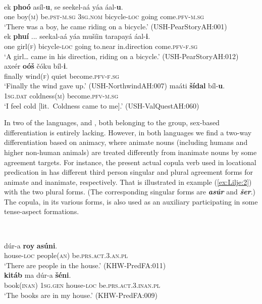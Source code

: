 \documentclass[output=collectionpaper]{langsci/langscibook}
\begin{document}
\ea
\label{ex:Lilje:1}
\\
\begin{xlist}
\ex
\gll ek \textbf{phoó} asíl-\textbf{u}, se seekel-aá yáa áal-\textbf{u}.\\
one boy(\textsc{m}) be.\textsc{pst-m.sg} \textsc{3sg.nom} bicycle-\textsc{loc} going come.\textsc{pfv-m.sg}\\
\glt  `There was a boy, he came riding on a bicycle.' (USH-PearStoryAH:001)\\
\ex
\gll ek \textbf{phuí} ... seekal-aá yáa mušíin tarapayá áal-\textbf{i}.\\
one girl(\textsc{f}) {} bicycle-\textsc{loc} going to.near in.direction come.\textsc{pfv-f.sg}\\
\glt `A girl… came in his direction, riding on a bicycle.' (USH-PearStoryAH:012)\\
\ex
\gll axeér \textbf{oóš} čóku bíl-\textbf{i}.    \\
finally wind(\textsc{f}) quiet become.\textsc{pfv-f.sg}    \\
\glt `Finally the wind gave up.' (USH-NorthwindAH:007)
\ex
\gll maáti \textbf{šídal} bíl-\textbf{u}.     \\
\textsc{1sg.dat} coldness(\textsc{m}) become.\textsc{pfv-m.sg}     \\
\glt `I feel cold [lit.\ Coldness came to me].' (USH-ValQuestAH:060)
\end{xlist}
\z

In two of the languages,  and , both belonging to the  group, sex-based differentiation is entirely lacking. However, in both languages we find a two-way differentiation based on animacy, where animate nouns (including humans and higher non-human animals) are treated differently from inanimate nouns by some agreement targets. For instance, the present actual copula verb used in locational predication in  has different third person singular and plural agreement forms for animate and inanimate, respectively. That is illustrated in example (\ref{ex:Lilje:2}) with the two plural forms. (The corresponding singular forms are \textbf{\textit{asú}}\textbf{\textit{r}} and \textbf{\textit{šer}}.) The copula, in its various forms, is also used as an auxiliary participating in some tense-aspect formations.

\ea
\label{ex:Lilje:2}
\\
\begin{xlist}
\ex
\gll dúr-a \textbf{roy}  \textbf{asúni}.     \\
house-\textsc{loc} people(\textsc{an}) be\textsc{.prs.act.3.an.}\textsc{pl}     \\
\glt `There are people in the house.' (KHW-PredFA:011)\\
\ex
\gll \textbf{kitáb}  ma dúr-a  \textbf{šéni}.    \\
book(\textsc{inan}) \textsc{1sg.gen} house-\textsc{loc} be\textsc{.prs.act.3.inan.pl}    \\
\glt `The books are in my house.' (KHW-PredFA:009)\\
\end{xlist}
\z
\end{document}
